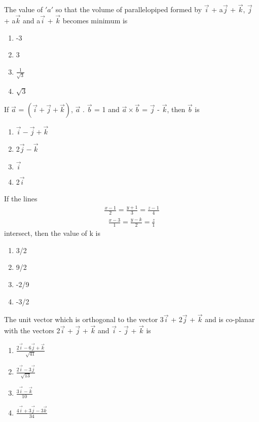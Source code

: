 \item The value of $'a'$ so that the volume of parallelopiped formed by $\overrightarrow{i}$ + a$\overrightarrow{j}$ + $\overrightarrow{k}$, $\overrightarrow{j}$ + a$\overrightarrow{k}$ and a$\overrightarrow{i}$ + $\overrightarrow{k}$ becomes minimum is
\begin{enumerate}
\item -3
\item 3
\item $\frac{1}{\sqrt{3}}$
\item $\sqrt{3}$
\end{enumerate}

\item If $\overrightarrow{a}$ = $(\overrightarrow{i} + \overrightarrow{j} + \overrightarrow{k})$, $\overrightarrow{a}$ . $\overrightarrow{b}$ = 1 and $\overrightarrow{a} \times \overrightarrow{b}$ = 
$\overrightarrow{j}$ - $\overrightarrow{k}$, then $\overrightarrow{b}$ is
\begin{enumerate}
\item $\overrightarrow{i} - \overrightarrow{j} + \overrightarrow{k}$
\item 2$\overrightarrow{j} - \overrightarrow{k}$
\item $\overrightarrow{i}$
\item 2$\overrightarrow{i}$
\end{enumerate}

\item If the lines 
\begin{align*}
\frac{x - 1}{2} = \frac{y + 1}{3} = \frac{z - 1}{4}
\end{align*}
\begin{align*}
\frac{x - 3}{1} = \frac{y - k}{2} = \frac{z}{1}
\end{align*}
intersect, then the value of k is
\begin{enumerate}
\item 3/2
\item 9/2
\item -2/9
\item -3/2
\end{enumerate}

\item The unit vector which is orthogonal to the vector 3$\overrightarrow{i}$ + 2$\overrightarrow{j}$ + $\overrightarrow{k}$ and is co-planar with the vectors 2$\overrightarrow{i}$ + $\overrightarrow{j}$ + $\overrightarrow{k}$ and $\overrightarrow{i}$ - $\overrightarrow{j}$ + $\overrightarrow{k}$ is
\begin{enumerate}
\item $\frac{2\overrightarrow{i} - 6\overrightarrow{j} + \overrightarrow{k}}{\sqrt{41}}$
\item $\frac{2\overrightarrow{i} - 3\overrightarrow{j}}{\sqrt{13}}$
\item $\frac{3\overrightarrow{i} - \overrightarrow{k}}{10}$
\item $\frac{4\overrightarrow{i} + 3\overrightarrow{j} - 3\overrightarrow{k}}{34}$
\end{enumerate}

